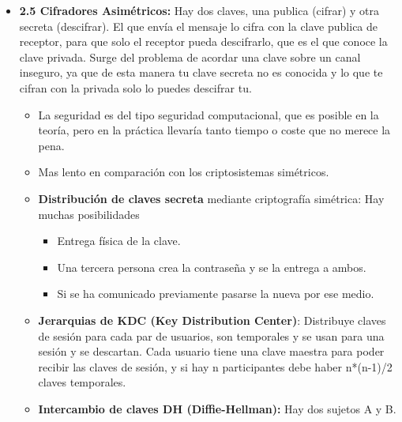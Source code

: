 \documentclass[12pt, twoside, openright]{report} %
\begin{document}
  \begin{itemize}
  \item \textbf{2.5 Cifradores Asimétricos:} Hay dos claves, una publica
    (cifrar) y otra secreta (descifrar). El que envía el mensaje lo
    cifra con la clave publica de receptor, para que solo el receptor
    pueda descifrarlo, que es el que conoce la clave privada. Surge del
    problema de acordar una clave sobre un canal inseguro, ya que de
    esta manera tu clave secreta no es conocida y lo que te cifran con
    la privada solo lo puedes descifrar tu.
    

    \begin{itemize}
    \item La seguridad es del tipo seguridad computacional, que es posible
      en la teoría, pero en la práctica llevaría tanto tiempo o coste
      que no merece la pena.
      
    \item Mas lento en comparación con los criptosistemas simétricos.
      
    \end{itemize}

    \begin{itemize}
    \item \textbf{Distribución de claves secreta} mediante criptografía
      simétrica: Hay muchas posibilidades
      

      \begin{itemize}
      \item Entrega física de la clave.
        
      \item Una tercera persona crea la contraseña y se la entrega a ambos.
        
      \item Si se ha comunicado previamente pasarse la nueva por ese medio.
        
      \end{itemize}
    \item \textbf{Jerarquias de KDC (Key Distribution Center)}: Distribuye
      claves de sesión para cada par de usuarios, son temporales y se
      usan para una sesión y se descartan. Cada usuario tiene una clave
      maestra para poder recibir las claves de sesión, y si hay n
      participantes debe haber n*(n-1)/2 claves temporales.
      
    \item \textbf{Intercambio de claves DH (Diffie-Hellman):} Hay dos
      sujetos A y B.
      


\end{itemize}
\end{itemize}
\end{document}
